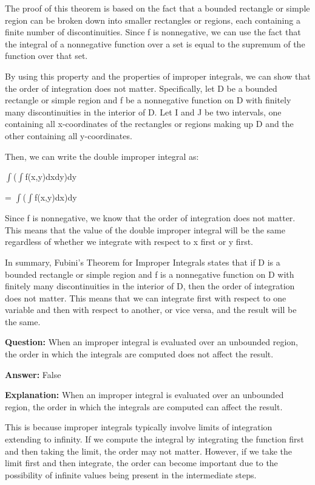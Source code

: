 \documentclass{article}
\begin{document}
The proof of this theorem is based on the fact that a bounded rectangle or simple region can be broken down into smaller rectangles or regions, each containing a finite number of discontinuities. Since f is nonnegative, we can use the fact that the integral of a nonnegative function over a set is equal to the supremum of the function over that set.

By using this property and the properties of improper integrals, we can show that the order of integration does not matter. Specifically, let D be a bounded rectangle or simple region and f be a nonnegative function on D with finitely many discontinuities in the interior of D. Let I and J be two intervals, one containing all x-coordinates of the rectangles or regions making up D and the other containing all y-coordinates.

Then, we can write the double improper integral as:

\ensuremath{\int}(\ensuremath{\int}f(x,y)dxdy)dy

= \ensuremath{\int}(\ensuremath{\int}f(x,y)dx)dy

Since f is nonnegative, we know that the order of integration does not matter. This means that the value of the double improper integral will be the same regardless of whether we integrate with respect to x first or y first.

In summary, Fubini's Theorem for Improper Integrals states that if D is a bounded rectangle or simple region and f is a nonnegative function on D with finitely many discontinuities in the interior of D, then the order of integration does not matter. This means that we can integrate first with respect to one variable and then with respect to another, or vice versa, and the result will be the same.
                
                \vspace{0.5cm} 
        
            
                \textbf {Question:} When an improper integral is evaluated over an unbounded region, the order in which the integrals are computed does not affect the result.
                
                \textbf{Answer:} False

                \textbf{Explanation:} When an improper integral is evaluated over an unbounded region, the order in which the integrals are computed can affect the result.

This is because improper integrals typically involve limits of integration extending to infinity. If we compute the integral by integrating the function first and then taking the limit, the order may not matter. However, if we take the limit first and then integrate, the order can become important due to the possibility of infinite values being present in the intermediate steps.
\end{document}
